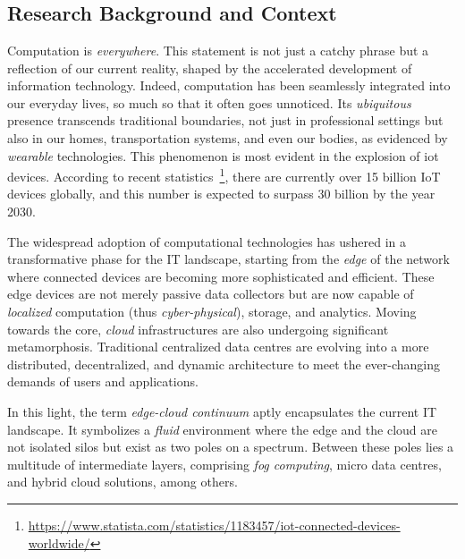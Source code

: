 \chapter{\introductionname}\label{chap:introduction}
\minitoc%
\section{Research Background and Context}
Computation is \textit{everywhere}. 
 This statement is not just a catchy phrase but a reflection of our current reality, 
 shaped by the accelerated development of information technology. 
 Indeed, computation has been seamlessly integrated into our everyday lives, 
 so much so that it often goes unnoticed. 
%
Its \emph{ubiquitous} presence transcends traditional boundaries, 
 not just in professional settings but also in our homes, transportation systems, 
 and even our bodies, as evidenced by \emph{wearable} technologies. 
% 
This phenomenon is most evident in the explosion of \ac{iot} devices. 
 According to recent statistics~\footnote{\url{https://www.statista.com/statistics/1183457/iot-connected-devices-worldwide/}}, 
 there are currently over 15 billion IoT devices globally, 
 and this number is expected to surpass 30 billion by the year 2030.

The widespread adoption of computational technologies has ushered in a transformative phase for the IT landscape, 
 starting from the \emph{edge} of the network where connected devices are becoming more sophisticated and efficient. 
 These edge devices are not merely passive data collectors but are now capable of \emph{localized} computation  (thus \emph{cyber-physical}), storage, and analytics. 
Moving towards the core, 
 \emph{cloud} infrastructures are also undergoing significant metamorphosis. 
 Traditional centralized data centres are evolving into a more distributed,
 decentralized, and dynamic architecture to meet the ever-changing demands of users and applications.

In this light, the term \emph{edge-cloud continuum} aptly encapsulates the current IT landscape. 
 It symbolizes a \emph{fluid} environment where the edge and the cloud are not isolated silos but exist as two poles on a spectrum. 
 Between these poles lies a multitude of intermediate layers, 
 comprising \emph{fog computing}, micro data centres, and hybrid cloud solutions, among others. 

